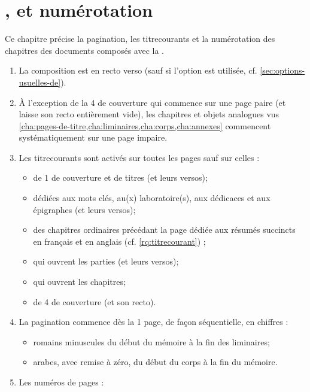 \chapter{\texorpdfstring{}{Titres courants},  et numérotation}\label{cha:pagination}

Ce chapitre précise la \gls{pagination}, les \glspl{titrecourant} et la
numérotation des chapitres des documents composés avec la \yatcl{}.

\begin{enumerate}
\item La composition est en recto verso (sauf si l'option 
  est utilisée, cf. \vref{sec:options-usuelles-de}).
\item À l'exception de la 4\ieme{} de couverture qui commence sur une page
  paire (et laisse son recto entièrement vide), les chapitres et objets
  analogues vus \vref{cha:pages-de-titre,cha:liminaires,cha:corps,cha:annexes}
  commencent systématiquement sur une page impaire.
\item Les \glspl{titrecourant} sont activés sur toutes les pages sauf sur
  celles :
  \begin{itemize}
  \item de 1\iere{} de couverture et de titres (et leurs versos);
  \item dédiées aux mots clés, au(x) laboratoire(s), aux dédicaces et aux
    épigraphes (et leurs versos);
  \item des chapitres ordinaires précédant la page dédiée aux résumés
  succincts en français et en anglais (cf. \vref{rq:titrecourant}) ;
  \item qui ouvrent les parties (et leurs versos);
  \item qui ouvrent les chapitres;
  \item de 4\ieme{} de couverture (et son recto).
  \end{itemize}
\item La \gls{pagination} commence dès la 1\iere{} page, de façon
  séquentielle, en chiffres :
  \begin{itemize}
  \item romains minuscules du début du mémoire à la fin des
    \glspl{liminaire};
  \item arabes, avec remise à zéro, du début du corps à la fin du
    mémoire.
  \end{itemize}
\item Les numéros de pages :
  \begin{itemize}

\end{itemize}
\end{enumerate}
